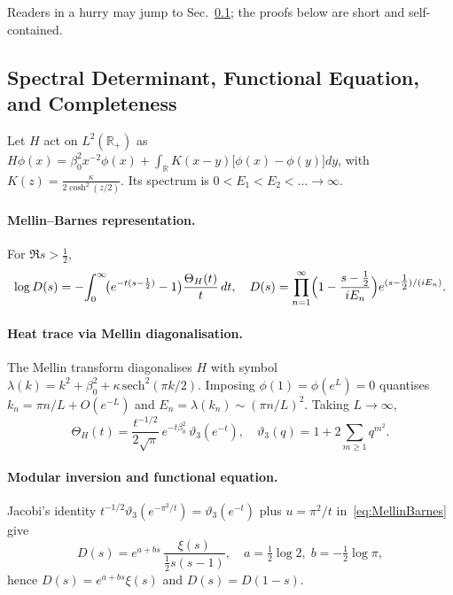 \documentclass[11pt]{article}
\begin{document}
\vspace{1ex}
\noindent
Readers in a hurry may jump to
Sec.~\ref{sec:determinant-completeness}; the proofs below are short
and self-contained.

\subsection{Spectral Determinant, Functional Equation,
            and Completeness}
\label{sec:determinant-completeness}

Let \(H\) act on \(L^{2}(\mathbb R_{+})\) as
\(
  H\phi(x)=\beta_{0}^{2}x^{-2}\phi(x)
          +\!\int_{\mathbb R}K(x-y)\bigl[\phi(x)-\phi(y)\bigr]dy
\),
with \(K(z)=\tfrac{\kappa}{2\cosh^{2}(z/2)}\).
Its spectrum is \(0<E_1<E_2<\dots\to\infty\).

\paragraph{Mellin–Barnes representation.}
For \(\Re s>\tfrac12\),
\begin{equation}\label{eq:MellinBarnes}
  \log D(s)=
  -\!\int_{0}^{\infty}
    \!\bigl(e^{-t(s-\frac12)}-1\bigr)\frac{\Theta_H(t)}{t}\,dt,
  \quad
  D(s)=\prod_{n=1}^{\infty}
        \Bigl(1-\frac{s-\tfrac12}{iE_n}\Bigr)
        e^{(s-\tfrac12)/(iE_n)}.
\end{equation}

\paragraph{Heat trace via Mellin diagonalisation.}
The Mellin transform diagonalises \(H\) with symbol
\(
   \lambda(k)=k^{2}+\beta_{0}^{2}+
              \kappa\,\mathrm{sech}^{2}(\pi k/2)
\).
Imposing \(\phi(1)=\phi(e^{L})=0\) quantises
\(k_n=\pi n/L+O(e^{-L})\) and \(E_n=\lambda(k_n)\sim(\pi n/L)^2\).
Taking \(L\to\infty\),
\[
   \Theta_H(t)=
   \frac{t^{-1/2}}{2\sqrt{\pi}}\,
   e^{-t\beta_{0}^{2}}\,\vartheta_3(e^{-t}),
   \quad
   \vartheta_3(q)=1+2\sum_{m\ge1}q^{m^{2}}.
\]

\paragraph{Modular inversion and functional equation.}
Jacobi’s identity
\(t^{-1/2}\vartheta_3(e^{-\pi^{2}/t})=\vartheta_3(e^{-t})\)
plus \(u=\pi^{2}/t\) in~\eqref{eq:MellinBarnes} give
\[
  D(s)=e^{a+bs}\,\frac{\xi(s)}{\frac12s(s-1)},
  \quad
  a=\tfrac12\log 2,\;
  b=-\tfrac12\log\pi,
\]
hence \(D(s)=e^{a+bs}\xi(s)\) and \(D(s)=D(1-s)\).
\end{document}
